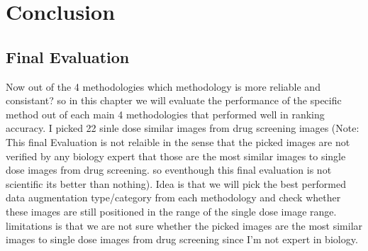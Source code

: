 \chapter{Conclusion}

\section{Final Evaluation}
Now out of the 4 methodologies which methodology is more reliable and consistant?
so in this chapter we will evaluate the performance of the specific method out of each main 4 methodologies that performed well in ranking accuracy.
I picked 22 sinle dose  similar images from drug screening images (Note: This final Evaluation is not relaible in the sense that the picked images are not verified by any biology expert that those are the most similar images to single dose images from drug screening. so eventhough this final evaluation is not scientific its better than nothing). Idea is that we will pick the best performed data augmentation type/category from each methodology and check whether these images are still positioned in the range of the single dose image range. limitations is that we are not sure whether the picked images are the most similar images to single dose images from drug screening since I'm not expert in biology.

